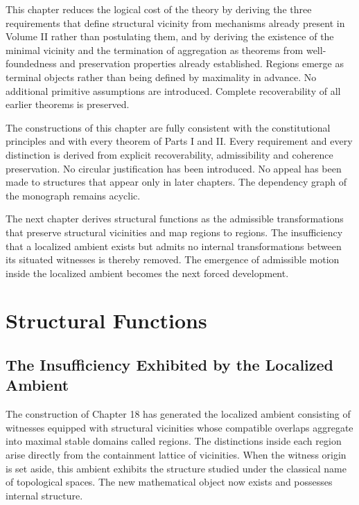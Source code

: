 \documentclass[12pt,anyside]{book}
\begin{document}
\begin{reductionaudit}
This chapter reduces the logical cost of the theory by deriving the three requirements that define structural vicinity from mechanisms already present in Volume II rather than postulating them, and by deriving the existence of the minimal vicinity and the termination of aggregation as theorems from well-foundedness and preservation properties already established. Regions emerge as terminal objects rather than being defined by maximality in advance. No additional primitive assumptions are introduced. Complete recoverability of all earlier theorems is preserved.
\end{reductionaudit}

\begin{consistencyaudit}
The constructions of this chapter are fully consistent with the constitutional principles and with every theorem of Parts I and II. Every requirement and every distinction is derived from explicit recoverability, admissibility and coherence preservation. No circular justification has been introduced. No appeal has been made to structures that appear only in later chapters. The dependency graph of the monograph remains acyclic.
\end{consistencyaudit}

\begin{futurework}
The next chapter derives structural functions as the admissible transformations that preserve structural vicinities and map regions to regions. The insufficiency that a localized ambient exists but admits no internal transformations between its situated witnesses is thereby removed. The emergence of admissible motion inside the localized ambient becomes the next forced development.
\end{futurework}

\chapter{Structural Functions}

\section{The Insufficiency Exhibited by the Localized Ambient}
The construction of Chapter 18 has generated the localized ambient consisting of witnesses equipped with structural vicinities whose compatible overlaps aggregate into maximal stable domains called regions. The distinctions inside each region arise directly from the containment lattice of vicinities. When the witness origin is set aside, this ambient exhibits the structure studied under the classical name of topological spaces. The new mathematical object now exists and possesses internal structure.
\end{document}
